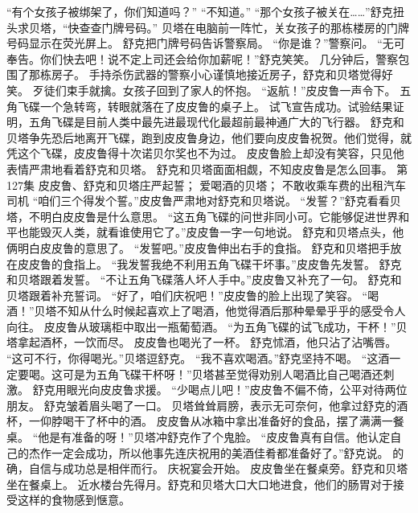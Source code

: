 \documentclass[a4paper,12pt,UTF8,twoside]{ctexbook}
\begin{document}
        “有个女孩子被绑架了，你们知道吗？” 
        “不知道。” 
        “那个女孩子被关在……”舒克扭头求贝塔，“快查查门牌号码。” 
        贝塔在电脑前一阵忙，关女孩子的那栋楼房的门牌号码显示在荧光屏上。 
        舒克把门牌号码告诉警察局。 
        “你是谁？”警察问。 
        “无可奉告。你们快去吧！说不定上司还会给你加薪呢！”舒克笑笑。 
        几分钟后，警察包围了那栋房子。 
        手持杀伤武器的警察小心谨慎地接近房子，舒克和贝塔觉得好笑。 
        歹徒们束手就擒。女孩子回到了家人的怀抱。 
        “返航！”皮皮鲁一声令下。 
        五角飞碟一个急转弯，转眼就落在了皮皮鲁的桌子上。 
        试飞宣告成功。试验结果证明，五角飞碟是目前人类中最先进最现代化最超前最神通广大的飞行器。 
        舒克和贝塔争先恐后地离开飞碟，跑到皮皮鲁身边，他们要向皮皮鲁祝贺。他们觉得，就凭这个飞碟，皮皮鲁得十次诺贝尔奖也不为过。 
        皮皮鲁脸上却没有笑容，只见他表情严肃地看着舒克和贝塔。 
        舒克和贝塔面面相觑，不知皮皮鲁是怎么回事。   第127集 
        皮皮鲁、舒克和贝塔庄严起誓； 
        爱喝酒的贝塔； 
        不敢收乘车费的出租汽车司机   
        “咱们三个得发个誓。”皮皮鲁严肃地对舒克和贝塔说。 
        “发誓？”舒克看看贝塔，不明白皮皮鲁是什么意思。 
        “这五角飞碟的问世非同小可。它能够促进世界和平也能毁灭人类，就看谁使用它了。”皮皮鲁一字一句地说。 
        舒克和贝塔点头，他俩明白皮皮鲁的意思了。 
        “发誓吧。”皮皮鲁伸出右手的食指。 
        舒克和贝塔把手放在皮皮鲁的食指上。 
        “我发誓我绝不利用五角飞碟干坏事。”皮皮鲁先发誓。 
        舒克和贝塔跟着发誓。 
        “不让五角飞碟落人坏人手中。”皮皮鲁又补充了一句。 
        舒克和贝塔跟着补充誓词。 
        “好了，咱们庆祝吧！”皮皮鲁的脸上出现了笑容。 
        “喝酒！”贝塔不知从什么时候起喜欢上了喝酒，他觉得酒后那种晕晕乎乎的感受令人向往。 
        皮皮鲁从玻璃柜中取出一瓶葡萄酒。 
        “为五角飞碟的试飞成功，干杯！”贝塔拿起酒杯，一饮而尽。 
        皮皮鲁也喝光了一杯。 
        舒克怵酒，他只沾了沾嘴唇。 
        “这可不行，你得喝光。”贝塔逗舒克。 
        “我不喜欢喝酒。”舒克坚持不喝。 
        “这酒一定要喝。这可是为五角飞碟干杯呀！”贝塔甚至觉得劝别人喝酒比自己喝酒还刺激。 
        舒克用眼光向皮皮鲁求援。 
        “少喝点儿吧！”皮皮鲁不偏不倚，公平对待两位朋友。 
        舒克皱着眉头喝了一口。 
        贝塔耸耸肩膀，表示无可奈何，他拿过舒克的酒杯，一仰脖喝干了杯中的酒。 
        皮皮鲁从冰箱中拿出准备好的食品，摆了满满一餐桌。 
        “他是有准备的呀！”贝塔冲舒克作了个鬼脸。 
        “皮皮鲁真有自信。他认定自己的杰作一定会成功，所以他事先连庆祝用的美酒佳肴都准备好了。”舒克说。 
        的确，自信与成功总是相伴而行。 
        庆祝宴会开始。 
        皮皮鲁坐在餐桌旁。舒克和贝塔坐在餐桌上。 
        近水楼台先得月。舒克和贝塔大口大口地进食，他们的肠胃对于接受这样的食物感到惬意。 
\end{document}

